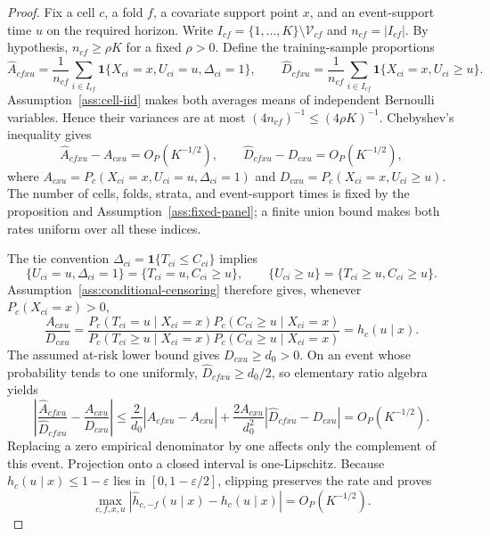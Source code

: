 \documentclass{article}
\begin{document}
\begin{proof}
Fix a cell \(c\), a fold \(f\), a covariate support point \(x\), and an event-support time \(u\) on the required horizon. Write \(I_{cf}=\{1,\ldots,K\}\setminus\mathcal V_{cf}\) and \(n_{cf}=|I_{cf}|\). By hypothesis, \(n_{cf}\ge \rho K\) for a fixed \(\rho>0\). Define the training-sample proportions
\[
 \widehat A_{cfxu}=\frac1{n_{cf}}\sum_{i\in I_{cf}}
 \mathbf 1\{X_{ci}=x,U_{ci}=u,\Delta_{ci}=1\},
 \qquad
 \widehat D_{cfxu}=\frac1{n_{cf}}\sum_{i\in I_{cf}}
 \mathbf 1\{X_{ci}=x,U_{ci}\ge u\}.
\]
Assumption~\ref{ass:cell-iid} makes both averages means of independent Bernoulli variables. Hence their variances are at most \((4n_{cf})^{-1}\le(4\rho K)^{-1}\). Chebyshev's inequality gives
\[
 \widehat A_{cfxu}-A_{cxu}=O_P(K^{-1/2}),
 \qquad
 \widehat D_{cfxu}-D_{cxu}=O_P(K^{-1/2}),
\]
where \(A_{cxu}=P_c(X_{ci}=x,U_{ci}=u,\Delta_{ci}=1)\) and \(D_{cxu}=P_c(X_{ci}=x,U_{ci}\ge u)\). The number of cells, folds, strata, and event-support times is fixed by the proposition and Assumption~\ref{ass:fixed-panel}; a finite union bound makes both rates uniform over all these indices.

The tie convention \(\Delta_{ci}=\mathbf 1\{T_{ci}\le C_{ci}\}\) implies
\[
 \{U_{ci}=u,\Delta_{ci}=1\}=\{T_{ci}=u,C_{ci}\ge u\},
 \qquad
 \{U_{ci}\ge u\}=\{T_{ci}\ge u,C_{ci}\ge u\}.
\]
Assumption~\ref{ass:conditional-censoring} therefore gives, whenever \(P_c(X_{ci}=x)>0\),
\[
 \frac{A_{cxu}}{D_{cxu}}
 =\frac{P_c(T_{ci}=u\mid X_{ci}=x)P_c(C_{ci}\ge u\mid X_{ci}=x)}
 {P_c(T_{ci}\ge u\mid X_{ci}=x)P_c(C_{ci}\ge u\mid X_{ci}=x)}
 =h_c(u\mid x).
\]
The assumed at-risk lower bound gives \(D_{cxu}\ge d_0>0\). On an event whose probability tends to one uniformly, \(\widehat D_{cfxu}\ge d_0/2\), so elementary ratio algebra yields
\[
 \left|\frac{\widehat A_{cfxu}}{\widehat D_{cfxu}}-\frac{A_{cxu}}{D_{cxu}}\right|
 \le \frac{2}{d_0}|\widehat A_{cfxu}-A_{cxu}|
 +\frac{2A_{cxu}}{d_0^2}|\widehat D_{cfxu}-D_{cxu}|
 =O_P(K^{-1/2}).
\]
Replacing a zero empirical denominator by one affects only the complement of this event. Projection onto a closed interval is one-Lipschitz. Because \(h_c(u\mid x)\le1-\varepsilon\) lies in \([0,1-\varepsilon/2]\), clipping preserves the rate and proves
\[
 \max_{c,f,x,u}|\widehat h_{c,-f}(u\mid x)-h_c(u\mid x)|=O_P(K^{-1/2}).
\]


\end{proof}
\end{document}
